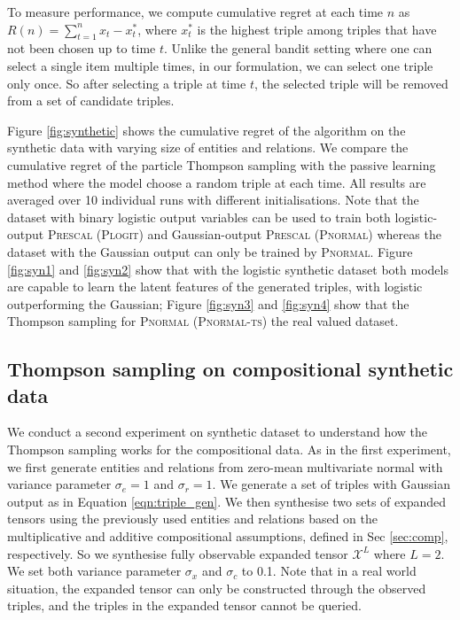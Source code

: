 To measure performance, we compute cumulative regret
at each time $n$ as $R(n) = \sum_{t=1}^{n} x_t - x^{*}_t$,
where $x^*_t$ is the highest triple among triples that have not been chosen up to time $t$. Unlike the general
bandit setting where one can select a single item multiple times, in our formulation, we can select one triple
only once. So after selecting a triple at time $t$, the selected triple will be removed from a set of candidate
triples.

Figure \ref{fig:synthetic} shows the cumulative regret of the algorithm on the synthetic data with varying size of
entities and relations. We compare the cumulative regret of the particle Thompson sampling with the passive
learning method where the model choose a random triple at each time. All results are averaged over 10
individual runs with different initialisations.
Note that the dataset with binary logistic output variables can be used to train both logistic-output \textsc{Prescal} (\textsc{Plogit}) and Gaussian-output \textsc{Prescal} (\textsc{Pnormal}) whereas the dataset with the Gaussian output can only be trained by \textsc{Pnormal}.
Figure \ref{fig:syn1} and \ref{fig:syn2} show that with the logistic synthetic dataset both models are capable to learn the latent features of the generated triples, with logistic outperforming the Gaussian; Figure \ref{fig:syn3} and \ref{fig:syn4} show that the Thompson sampling for \textsc{Pnormal} (\textsc{Pnormal-ts})  the real valued dataset.

\subsection{Thompson sampling on compositional synthetic data}

We conduct a second experiment on synthetic dataset to understand how
the Thompson sampling works for the compositional data.
As in the first experiment, we first generate entities and relations from
zero-mean multivariate normal with variance parameter $\sigma_e = 1$ and
$\sigma_r=1$. We generate a set of triples with Gaussian output as in
Equation \ref{eqn:triple_gen}. We then synthesise two sets of expanded tensors
using the previously used entities and relations based on the multiplicative
and additive compositional assumptions, defined in Sec \ref{sec:comp},
respectively. So we synthesise fully observable expanded tensor $\mathcal{X}^L$
where $L=2$. We set both variance parameter $\sigma_x$ and $\sigma_c$ to 0.1.
Note that in a real world situation, the expanded tensor can only be constructed
through the observed triples, and the triples in the expanded tensor cannot be queried.

